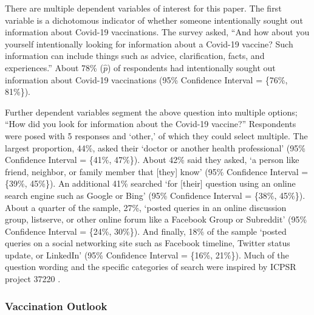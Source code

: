 There are multiple dependent variables of interest for this paper. The first
variable is a dichotomous indicator of whether someone intentionally sought out
information about Covid-19 vaccinations. The survey asked, ``And how about you
yourself intentionally looking for information about a Covid-19 vaccine? Such
information can include things such as advice, clarification, facts, and
experiences.'' About 78\% (\(\widehat{p}\))
of respondents had intentionally sought out information about Covid-19
vaccinations (95\% Confidence Interval = \{76\%, 81\%\}).

Further dependent variables segment the above question into multiple options;
``How did you look for information about the Covid-19 vaccine?'' Respondents were
posed with 5 responses and `other,' of which they could select multiple. The
largest proportion, 44\%, asked their `doctor or another health professional' (95\% Confidence Interval = \{41\%, 47\%\}). About 42\% said they asked, `a person
like friend, neighbor, or family member that {[}they{]} know' (95\% Confidence
Interval = \{39\%, 45\%\}). An additional 41\% searched `for {[}their{]} question
using an online search engine such as Google or Bing' (95\% Confidence Interval
= \{38\%, 45\%\}). About a quarter of the sample, 27\%, `posted queries in an
online discussion group, listserve, or other online forum like a Facebook Group
or Subreddit' (95\% Confidence Interval = \{24\%, 30\%\}). And finally, 18\% of the sample `posted queries on a social networking site such as Facebook timeline, Twitter status update, or LinkedIn' (95\% Confidence Interval = \{16\%, 21\%\}).
Much of the question wording and the specific categories of search were inspired
by ICPSR project 37220 \citep{scanlon19}.



\hypertarget{vaccination-outlook}{%
\subsubsection{Vaccination Outlook}\label{vaccination-outlook}}

